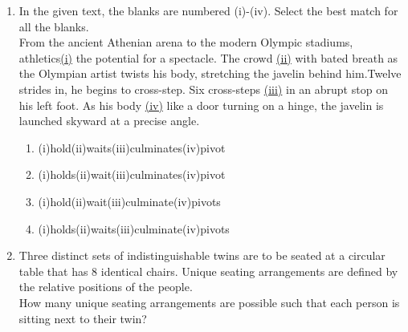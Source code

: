 \documentclass[a4paper,12pt]{exam}
\numberwithin{equation}{enumi}
\numberwithin{figure}{enumi}
\begin{document}
\begin{enumerate}
\item In the given text, the blanks are numbered (i)-(iv). Select the best match for  all the blanks.\\
From the ancient Athenian arena to the modern Olympic  stadiums,  athletics{\underline{\hspace{0.5cm}(i)\hspace{0.5cm}}} the potential for a spectacle. The crowd {\underline{\hspace{0.5cm}(ii)\hspace{0.5cm}}}  
with bated breath as the Olympian artist twists his body, stretching the javelin behind him.Twelve strides in, he begins to cross-step. Six cross-steps {\underline{\hspace{0.5cm}(iii)\hspace{0.5cm}}} in an abrupt  stop on his left foot. As his body {\underline{\hspace{0.5cm}(iv)\hspace{0.5cm}}} like a door turning on a hinge, the  javelin is launched skyward at a precise angle. 

\hfill{}

\begin{enumerate}

\item (i)hold\hspace{0.75cm}(ii)waits\hspace{0.75cm}(iii)culminates\hspace{0.75cm}(iv)pivot
\item (i)holds\hspace{0.75cm}(ii)wait\hspace{0.75cm}(iii)culminates\hspace{0.75cm}(iv)pivot
\item (i)hold\hspace{0.75cm}(ii)wait\hspace{0.75cm}(iii)culminate\hspace{0.75cm}(iv)pivots
\item (i)holds\hspace{0.75cm}(ii)waits\hspace{0.75cm}(iii)culminate\hspace{0.75cm}(iv)pivots
\end{enumerate}


\item Three distinct sets of indistinguishable twins are to be seated at a circular table that  has 8 identical chairs. Unique seating arrangements are defined by the relative  positions of the people.\\  How many unique seating arrangements are possible such that each person is sitting 
next to their twin?


\end{enumerate}
\end{document}
